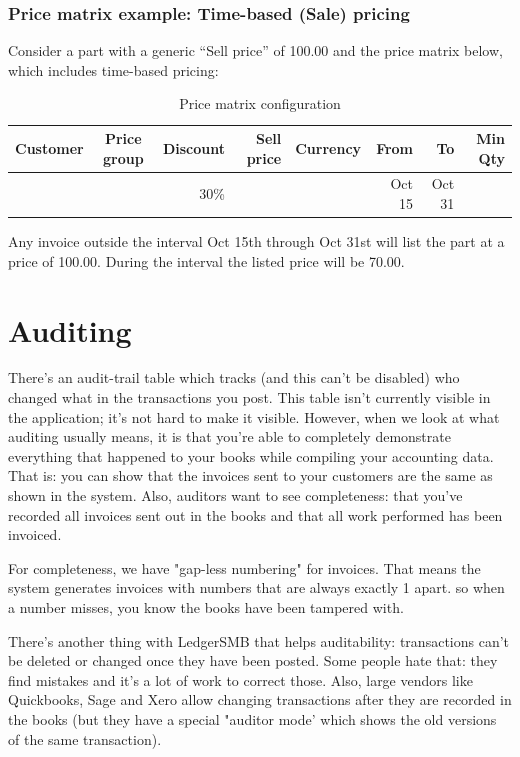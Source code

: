 \subsection{Price matrix example: Time-based (Sale) pricing}

Consider a part with a generic ``Sell price'' of 100.00 and the price matrix below, which includes time-based pricing:

\begin{table}[H]
	\caption{Price matrix configuration}
	\begin{tabular}{|ccrrcrrr|}
		\hline
		\bf Customer & \bf Price group & \bf Discount &  \bf Sell price & \bf Currency & \bf From & \bf To & \bf Min Qty \\
		\hline
		& & 30\% & & & Oct 15 & Oct 31 & \\
		\hline
	\end{tabular}
\end{table}

Any invoice outside the interval Oct 15th through Oct 31st will list
the part at a price of 100.00.  During the interval the listed price
will be 70.00.

\chapter{Auditing}
\label{cha-auditing}

There's an audit-trail table which tracks (and this can't be disabled) who changed what in the transactions you post. This table isn't currently visible in the application; it's not hard to make it visible. However, when we look at what auditing usually means, it is that you're able to completely demonstrate everything that happened to your books while compiling your accounting data. That is: you can show that the invoices sent to your customers are the same as shown in the system. Also, auditors want to see completeness: that you've recorded all invoices sent out in the books and that all work performed has been invoiced.

For completeness, we have "gap-less numbering" for invoices.
That means the system generates invoices with numbers that are always exactly 1 apart.
so when a number misses, you know the books have been tampered with.

There's another thing with LedgerSMB that helps auditability: transactions can't be deleted or changed once they have been posted. Some people hate that: they find mistakes and it's a lot of work to correct those. Also, large vendors like Quickbooks, Sage and Xero allow changing transactions after they are recorded in the books (but they have a special "auditor mode' which shows the old versions of the same transaction).

